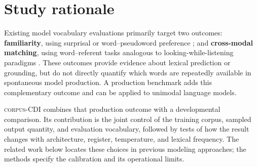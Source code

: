 \graphicspath{{ch3/papers/exp_vocab/}}
\providecommand{\meCDI}{\textsc{corpus-CDI}}



\section{Study rationale}




Existing model vocabulary evaluations primarily target two outcomes: \textbf{familiarity}, using surprisal or word--pseudoword preference \citep{chang2022word,ma2025babysit,lavechin2025simulating}; and \textbf{cross-modal matching}, using word--referent tasks \citep{vong2024grounded,tan2024devbench,nikolaus2021modeling} analogous to looking-while-listening paradigms \citep{swingley2011looking}. These outcomes provide evidence about lexical prediction or grounding, but do not directly quantify which words are repeatedly available in spontaneous model production. A production benchmark adds this complementary outcome and can be applied to unimodal language models.



\meCDI{} combines that production outcome with a developmental comparison. Its contribution is the joint control of the training corpus, sampled output quantity, and evaluation vocabulary, followed by tests of how the result changes with architecture, register, temperature, and lexical frequency. The related work below locates these choices in previous modeling approaches; the methods specify the calibration and its operational limits.








